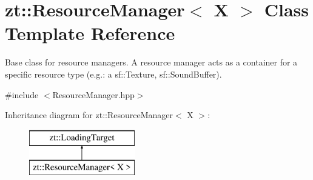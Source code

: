 \hypertarget{classzt_1_1_resource_manager}{}\section{zt\+:\+:Resource\+Manager$<$ X $>$ Class Template Reference}
\label{classzt_1_1_resource_manager}


Base class for resource managers. A resource manager acts as a container for a specific resource type (e.\+g.\+: a sf\+::\+Texture, sf\+::\+Sound\+Buffer).  




{\ttfamily \#include $<$Resource\+Manager.\+hpp$>$}

Inheritance diagram for zt\+:\+:Resource\+Manager$<$ X $>$\+:\begin{figure}[H]
\begin{center}
\leavevmode
\includegraphics[height=2.000000cm]{classzt_1_1_resource_manager}
\end{center}
\end{figure}
